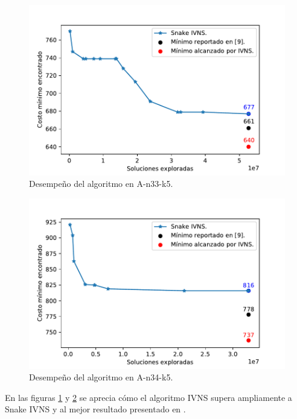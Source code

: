 \documentclass[a4paper,10pt,twocolumn]{article}
\begin{document}
	\begin{figure}[htbp]
		\centering
		\includegraphics[scale=.55]{Graphics/result_A-n33-k5.pdf}
		\caption{Desempeño del algoritmo en A-n33-k5.}\label{fig:result33_5}
	\end{figure}
	\begin{figure}[ht]
		\centering
		\includegraphics[scale=.55]{Graphics/result_A-n34-k5.pdf}
		\caption{Desempeño del algoritmo en A-n34-k5.}\label{fig:result34_5}
	\end{figure}
	
	En las figuras \ref{fig:result33_5} y \ref{fig:result34_5} se aprecia cómo el 
	algoritmo IVNS supera ampliamente a Snake IVNS y al mejor resultado presentado en 
	\cite{neo}.
	
\end{document}
